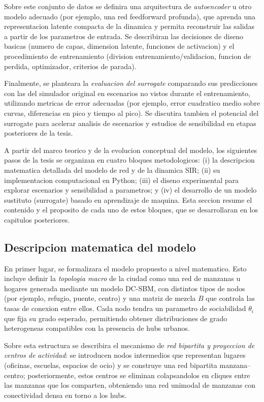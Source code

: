 Sobre este conjunto de datos se definira una arquitectura de \emph{autoencoder} u otro modelo adecuado (por ejemplo, una red feedforward profunda), que aprenda una representacion latente compacta de la dinamica y permita reconstruir las salidas a partir de los parametros de entrada. 
Se describiran las decisiones de diseno basicas (numero de capas, dimension latente, funciones de activacion) y el procedimiento de entrenamiento (division entrenamiento/validacion, funcion de perdida, optimizador, criterios de parada).

Finalmente, se planteara la \emph{evaluacion del surrogate} comparando sus predicciones con las del simulador original en escenarios no vistos durante el entrenamiento, utilizando metricas de error adecuadas (por ejemplo, error cuadratico medio sobre curvas, diferencias en pico y tiempo al pico). 
Se discutira tambien el potencial del surrogate para acelerar analisis de escenarios y estudios de sensibilidad en etapas posteriores de la tesis.


A partir del marco teorico y de la evolucion conceptual del modelo, los siguientes pasos de la tesis se organizan en cuatro bloques metodologicos: 
(i) la descripcion matematica detallada del modelo de red y de la dinamica SIR; 
(ii) su implementacion computacional en Python; 
(iii) el diseno experimental para explorar escenarios y sensibilidad a parametros; 
y (iv) el desarrollo de un modelo sustituto (surrogate) basado en aprendizaje de maquina. 
Esta seccion resume el contenido y el proposito de cada uno de estos bloques, que se desarrollaran en los capitulos posteriores.

\subsection{Descripcion matematica del modelo}

En primer lugar, se formalizara el modelo propuesto a nivel matematico. 
Esto incluye definir la \emph{topologia macro} de la ciudad como una red de manzanas u hogares generada mediante un modelo DC-SBM, con distintos tipos de nodos (por ejemplo, refugio, puente, centro) y una matriz de mezcla $B$ que controla las tasas de conexion entre ellos. 
Cada nodo tendra un parametro de sociabilidad $\theta_i$ que fija su grado esperado, permitiendo obtener distribuciones de grado heterogeneas compatibles con la presencia de hubs urbanos.

Sobre esta estructura se describira el mecanismo de \emph{red bipartita y proyeccion de centros de actividad}: se introducen nodos intermedios que representan lugares (oficinas, escuelas, espacios de ocio) y se construye una red bipartita manzana–centro; posteriormente, estos centros se eliminan colapsandolos en cliques entre las manzanas que los comparten, obteniendo una red unimodal de manzanas con conectividad densa en torno a los hubs.


